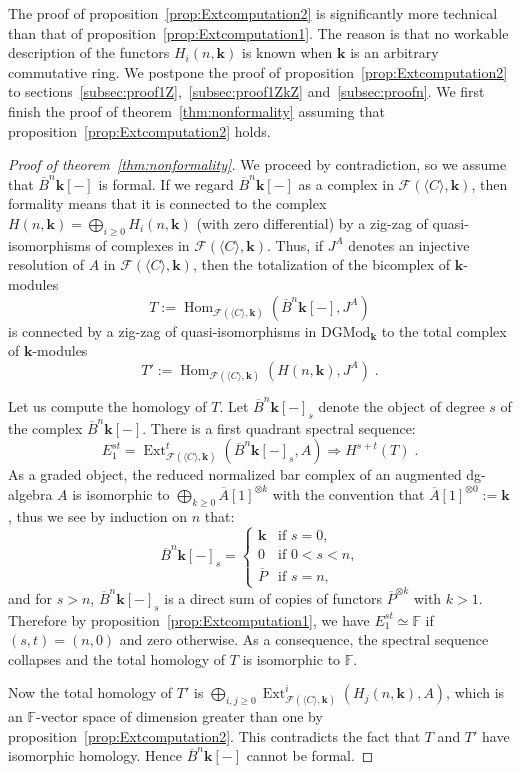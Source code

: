 \documentclass{amsart}
\theoremstyle{definition}
\theoremstyle{remark}
\newcommand{\F}{\mathbb F}
\DeclareMathOperator{\Hm}{Hom}
\DeclareMathOperator{\Ext}{Ext}
\renewcommand{\ge}{\geqslant}
\def\k{\mathbf{k}}
\begin{document}
The proof of proposition~\ref{prop:Extcomputation2} is significantly more technical than that of proposition~\ref{prop:Extcomputation1}. The reason is that no workable description of the functors $H_i(n,\k)$ is known when $\k$ is an arbitrary commutative ring. We postpone the proof of proposition~\ref{prop:Extcomputation2} to sections~\ref{subsec:proof1Z},~\ref{subsec:proof1ZkZ} and~\ref{subsec:proofn}.
We first finish the proof of theorem~\ref{thm:nonformality} assuming that proposition~\ref{prop:Extcomputation2} holds.
\begin{proof}[Proof of theorem~\ref{thm:nonformality}]
	We proceed by contradiction, so we assume that $\overline{B}^n\k[-]$ is formal. If we regard $\overline{B}^n\k[-]$ as a complex in $\mathcal{F}(\langle C\rangle,\k)$, then formality means that it is connected to the complex $H(n,\k)=\bigoplus_{i\ge 0}H_i(n,\k)$ (with zero differential) by a zig-zag of quasi-isomorphisms of complexes in $\mathcal{F}(\langle C\rangle,\k)$. Thus, if $J^A$ denotes an injective resolution of $A$ in $\mathcal{F}(\langle C\rangle,\k)$, then the totalization of the bicomplex of $\k$-modules
	\[
		T:=\Hm_{\mathcal{F}(\langle C\rangle,\k)}(\overline{B}^n\k[-],J^A)
	\]
	is connected by a zig-zag of quasi-isomorphisms in $\mathrm{DGMod}_\k$ to the total complex of $\k$-modules
	\[
		T':=\Hm_{\mathcal{F}(\langle C\rangle,\k)}(H(n,\k),J^A)\;.
	\]
	
	Let us compute the homology of $T$. Let $\overline{B}^n\k[-]_s$ denote the object of degree $s$ of the complex  $\overline{B}^n\k[-]$. There is a first quadrant spectral sequence:
	\[
		E_1^{st}=\Ext^t_{\mathcal{F}(\langle C\rangle,\k)}(\overline{B}^n\k[-]_s,A)\Rightarrow H^{s+t}(T)\;.
	\]
	As a graded object, the reduced normalized bar complex of an augmented dg-algebra $A$ is isomorphic to $\bigoplus_{k\ge 0}\overline{A}[1]^{\otimes k}$ with the convention that $\overline{A}[1]^{\otimes 0}:=\k$, 
	thus we see by induction on $n$ that:
	\[ 
		\overline{B}^n\k[-]_s = 
		\begin{cases}
			\k & \text{if $s=0$,}\\
			0 & \text{if $0<s<n$,}\\
			\overline{P} & \text{if $s=n$,}
		\end{cases}
	\]
	and for $s>n$, $\overline{B}^n\k[-]_s$ is a direct sum of copies of functors $\overline{P}^{\otimes k}$ with $k>1$. Therefore by proposition~\ref{prop:Extcomputation1}, we have $E_1^{st}\simeq\F$ if $(s,t)=(n,0)$ and zero otherwise. As a consequence, the spectral sequence collapses and the total homology of $T$ is isomorphic to $\F$.
	
	Now the total homology of $T'$ is $\bigoplus_{i,j\ge 0}\Ext^i_{\mathcal{F}(\langle C\rangle,\k)}(H_j(n,\k),A)$, which is an $\F$-vector space of dimension greater than one by proposition~\ref{prop:Extcomputation2}. This contradicts the fact that $T$ and $T'$ have isomorphic homology. Hence $\overline{B}^n\k[-]$ cannot be formal.
\end{proof}
\end{document}

